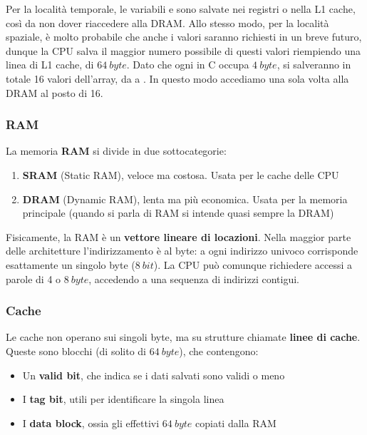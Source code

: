 \documentclass[11pt, a4paper, titlepage, oneside]{scrbook}
\begin{document}
Per la località temporale, le variabili  e  sono salvate nei registri o nella L1 cache, così da non dover riaccedere alla DRAM. Allo stesso modo, per la località spaziale, è molto probabile che anche i valori  saranno richiesti in un breve futuro, dunque la CPU salva il maggior numero possibile di questi valori riempiendo una linea di L1 cache, di $\SI{64}{byte}$. Dato che ogni  in C occupa $\SI{4}{byte}$, si salveranno in totale 16 valori dell'array, da  a . In questo modo accediamo una sola volta alla DRAM al posto di 16.

\subsubsection*{RAM}

\begin{Definizione}[RAM]
\label{def-RAM}
La memoria \textbf{RAM} si divide in due sottocategorie:
\begin{enumerate}
    \item \textbf{SRAM} (Static RAM), veloce ma costosa. Usata per le cache delle CPU
    \item \textbf{DRAM} (Dynamic RAM), lenta  ma più economica. Usata per la memoria principale (quando si parla di RAM si intende quasi sempre la DRAM)
\end{enumerate}
\end{Definizione}

Fisicamente, la RAM è un \textbf{vettore lineare di locazioni}. Nella maggior parte delle architetture l'indirizzamento è al byte: a ogni indirizzo univoco corrisponde esattamente un singolo byte ($\SI{8}{bit}$). La CPU può comunque richiedere accessi a parole di 4 o $\SI{8}{byte}$, accedendo a una sequenza di indirizzi contigui.

\subsubsection*{Cache}

\begin{Definizione}
\label{def-linee-cache}
Le cache non operano sui singoli byte, ma su strutture chiamate \textbf{linee di cache}. Queste sono blocchi (di solito di $\SI{64}{byte}$), che contengono:
\begin{itemize}
    \item Un \textbf{valid bit}, che indica se i dati salvati sono validi o meno
    \item I \textbf{tag bit}, utili per identificare la singola linea
    \item I \textbf{data block}, ossia gli effettivi $\SI{64}{byte}$ copiati dalla RAM
\end{itemize}
\end{Definizione}
\end{document}

